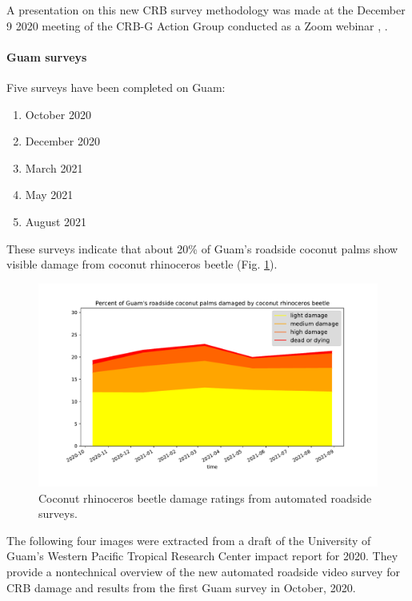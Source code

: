 \documentclass[12pt,letterpaper,english,bibliography=totocnumbered,abstract=on]{scrartcl}
\begin{document}
A presentation on this new CRB survey methodology was made at the December 9 2020 meeting of the CRB-G Action Group conducted as a Zoom webinar \cite{mooreVideoRecordingCRBG2020}, \cite{mooreAutomatedRoadsideVideo2020}.

\paragraph{Guam surveys}

Five surveys have been completed on Guam:
\begin{enumerate}
	\item October 2020 \cite{mooreCRBDamageWebmap2020} 
	\item December 2020 \cite{mooreCRBDamageWebmap2020a}
	\item March 2021 \cite{mooreCRBDamageWebmap2021}
	\item May 2021 \cite{mooreCRBDamageWebmap2021a}
	\item August 2021 \cite{mooreCRBDamageWebmap2021b}	
\end{enumerate}

\newpage

These surveys indicate that about 20\% of Guam's roadside coconut palms show visible damage from coconut rhinoceros beetle (Fig. \ref{fig:timeline}).

\begin{figure}[h]
	\centering
	\includegraphics[width=0.7\linewidth]{images/timeline}
	\caption{Coconut rhinoceros beetle damage ratings from automated roadside surveys.}
	\label{fig:timeline}
\end{figure}

The following four images were extracted from a draft of the University of Guam's Western Pacific Tropical Research Center impact report for 2020. They provide a nontechnical overview of the new automated roadside video survey for CRB damage and results from the first Guam survey in October, 2020.
\end{document}
